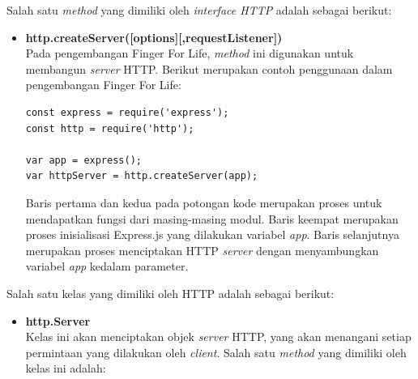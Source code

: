 \begin{enumerate}
\begin{enumerate}
		Salah satu \textit{method} yang dimiliki oleh \textit{interface HTTP} adalah sebagai berikut:
		
		\begin{itemize}
			\item \textbf{http.createServer([options][,requestListener])} \\
			Pada pengembangan Finger For Life, \textit{method} ini digunakan untuk membangun \textit{server} HTTP. Berikut merupakan contoh penggunaan dalam pengembangan Finger For Life:
\begin{lstlisting}[caption={Contoh penggunaan \textit{method createServer(options[,requestListener])}}, label={lst:node_createServer}, captionpos=b]
const express = require('express');
const http = require('http');

var app = express();
var httpServer = http.createServer(app);
\end{lstlisting}

Baris pertama dan kedua pada potongan kode merupakan proses untuk mendapatkan fungsi dari masing-masing modul. Baris keempat merupakan proses inisialisasi Express.js yang dilakukan variabel \textit{app}. Baris selanjutnya merupakan proses menciptakan HTTP \textit{server} dengan menyambungkan variabel \textit{app} kedalam parameter.			
		\end{itemize}
	
		Salah satu kelas yang dimiliki oleh HTTP adalah sebagai berikut:
		\begin{itemize}
			\item \textbf{http.Server} \\
			Kelas ini akan menciptakan objek \textit{server} HTTP, yang akan menangani setiap permintaan yang dilakukan oleh \textit{client}. Salah satu \textit{method} yang dimiliki oleh kelas ini adalah:
			

\end{itemize}
\end{enumerate}
\end{enumerate}
